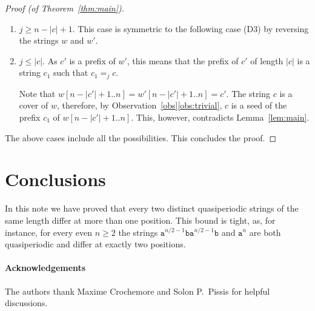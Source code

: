 \documentclass{article}
\begin{document}
\begin{proof}[Proof (of Theorem~\ref{thm:main})]
\begin{enumerate}[(A)]
\begin{enumerate}[(E1)]
            Consider the factors $w[1..|c'|]$ and $w[n-|c'|+1..n]$;
            note that they cover disjoint sets of positions.

            If $j \le |c'|$, then $w[n-|c'|+1..n]=w'[n-|c'|+1..n]=c'$.
            The string $c$ is a border of $c'=w[n-|c'|+1..n]$ and a cover of $w$.
            Hence, by Observation~\ref{obs}\ref{obs:trivial}, $c$ is a cover of $c'$.
            This contradicts the opposite observation that we have just made.
            Otherwise (if $j > |c'|$) we see that similarly $c$ is
            a cover of $w[1..|c'|] = c'$, again a contradiction.
          \item $j \ge n-|c|+1$.
            This case is symmetric to the following case (D3)
            by reversing the strings $w$ and $w'$.
          \item $j \le |c|$.
            As $c'$ is a prefix of $w'$, this means that the prefix of $c'$
            of length $|c|$ is a string $c_1$ such that $c_1 =_j c$.
            
            Note that $w[n-|c'|+1..n] = w'[n-|c'|+1..n] = c'$.
            The string $c$ is a cover of $w$, therefore, by Observation~\ref{obs}\ref{obs:trivial},
            $c$ is a seed of the prefix $c_1$ of $w[n-|c'|+1..n]$.
            This, however, contradicts Lemma~\ref{lem:main}.
        \end{enumerate}
    \end{enumerate}
    The above cases include all the possibilities.
    This concludes the proof.
  \end{proof}
  
  \section{Conclusions}
  In this note we have proved that every two distinct quasiperiodic strings of the same length differ at more than one position.
  This bound is tight, as, for instance, for every even $n \ge 2$ the strings $\mathtt{a}^{n/2-1}\mathtt{b}\mathtt{a}^{n/2-1}\mathtt{b}$ and $\mathtt{a}^n$
  are both quasiperiodic and differ at exactly two positions.

  \paragraph{Acknowledgements}
  The authors thank Maxime Crochemore and Solon P.\ Pissis for helpful discussions.
\end{document}

